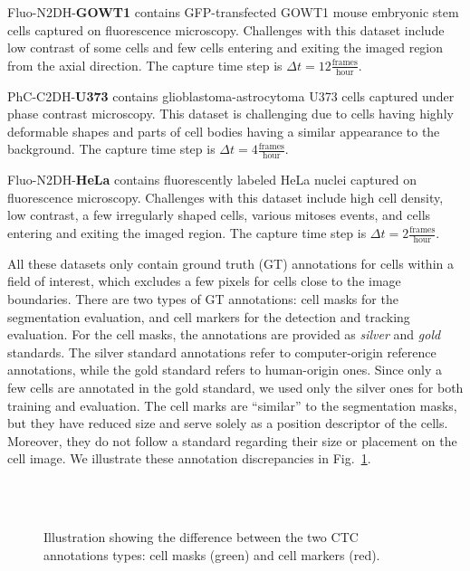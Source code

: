 \documentclass{article}
\begin{document}
Fluo-N2DH-\textbf{GOWT1} contains GFP-transfected GOWT1 mouse embryonic stem cells captured on fluorescence microscopy. Challenges with this dataset include low contrast of some cells and few cells entering and exiting the imaged region from the axial direction. The capture time step is $\Delta t = 12 \frac{\text{frames}}{\text{hour}}$.

PhC-C2DH-\textbf{U373} contains glioblastoma-astrocytoma U373 cells captured under phase contrast microscopy. This dataset is challenging due to cells having highly deformable shapes and parts of cell bodies having a similar appearance to the background. The capture time step is $\Delta t = 4 \frac{\text{frames}}{\text{hour}}$.

Fluo-N2DH-\textbf{HeLa} contains fluorescently labeled HeLa nuclei captured on fluorescence microscopy. Challenges with this dataset include high cell density, low contrast, a few irregularly shaped cells, various mitoses events, and cells entering and exiting the imaged region. The capture time step is $\Delta t = 2 \frac{\text{frames}}{\text{hour}}$.

All these datasets only contain ground truth (GT) annotations for cells within a field of interest, which excludes a few pixels for cells close to the image boundaries. There are two types of GT annotations: cell masks for the segmentation evaluation, and cell markers for the detection and tracking evaluation. For the cell masks, the annotations are provided as \emph{silver} and \emph{gold} standards. The silver standard annotations refer to computer-origin reference annotations, while the gold standard refers to human-origin ones. Since only a few cells are annotated in the gold standard, we used only the silver ones for both training and evaluation. The cell marks are ``similar'' to the segmentation masks, but they have reduced size and serve solely as a position descriptor of the cells. Moreover, they do not follow a standard regarding their size or placement on the cell image. We illustrate these annotation discrepancies in Fig.~\ref{fig:comparsion_masks_marks}.

\begin{figure}[]
\centering
{} ~
 ~
 \vspace{0.1cm} \\
 ~
 ~
\caption[Illustration showing the difference between the two CTC annotations types.]{Illustration showing the difference between the two CTC~\cite{isbi} annotations types: cell masks (green) and cell markers (red).}
\label{fig:comparsion_masks_marks}
\end{figure}
\end{document}
